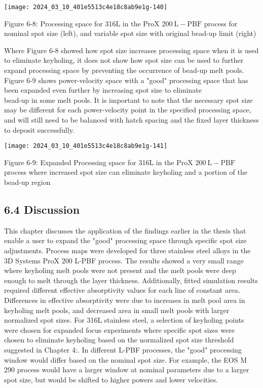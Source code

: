 \documentclass[10pt]{article}
\begin{document}
\begin{center}
\texttt{[image: 2024\_03\_10\_401e5513c4e18c8ab9e1g-140]}
\end{center}

Figure 6-8: Processing space for 316L in the ProX $200 \mathrm{~L}-\mathrm{PBF}$ process for nominal spot size (left), and variable spot size with original bead-up limit (right)

Where Figure 6-8 showed how spot size increases processing space when it is used to eliminate keyholing, it does not show how spot size can be used to further expand processing space by preventing the occurrence of bead-up melt pools. Figure 6-9 shows power-velocity space with a "good" processing space that has been expanded even further by increasing spot size to eliminate\\
bead-up in some melt pools. It is important to note that the necessary spot size may be different for each power-velocity point in the specified processing space, and will still need to be balanced with hatch spacing and the fixed layer thickness to deposit successfully.

\begin{center}
\texttt{[image: 2024\_03\_10\_401e5513c4e18c8ab9e1g-141]}
\end{center}

Figure 6-9: Expanded Processing space for 316L in the ProX $200 \mathrm{~L}-\mathrm{PBF}$ process where increased spot size can eliminate keyholing and a portion of the bead-up region

\subsection*{6.4 Discussion}
This chapter discusses the application of the findings earlier in the thesis that enable a user to expand the "good" processing space through specific spot size adjustments. Process maps were developed for three stainless steel alloys in the 3D Systems ProX 200 L-PBF process. The results showed a very small range where keyholing melt pools were not present and the melt pools were deep enough to melt through the layer thickness. Additionally, fitted simulation results required different effective absorptivity values for each line of constant area. Differences in effective absorptivity were due to increases in melt pool area in keyholing melt pools, and decreased area in small melt pools with larger normalized spot sizes. For 316L stainless steel, a selection of keyholing points were chosen for expanded focus experiments where specific spot sizes were\\
chosen to eliminate keyholing based on the normalized spot size threshold suggested in Chapter 4:. In different L-PBF processes, the "good" processing window would differ based on the nominal spot size. For example, the EOS M 290 process would have a larger window at nominal parameters due to a larger spot size, but would be shifted to higher powers and lower velocities.
\end{document}

